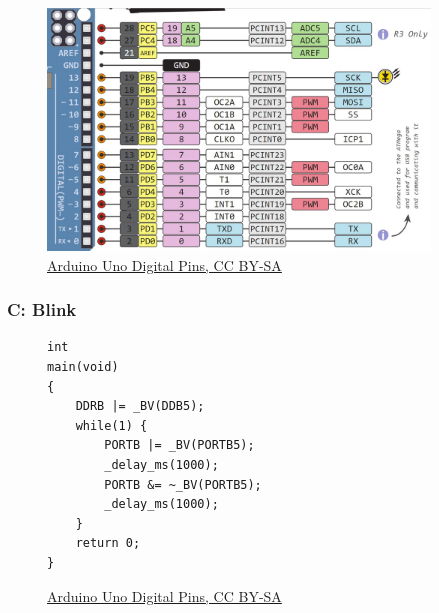 \documentclass{beamer} \usetheme{Madrid}
\begin{document}
\begin{frame}
    \vfill
    \begin{center}
    \begin{figure}
        \includegraphics[width=4in]{arduinopins.png}
        \caption{\href{https://www.circuito.io/blog/arduino-uno-pinout/}{Arduino Uno Digital Pins, CC BY-SA}}
    \end{figure}
    \end{center}
    \vfill
\end{frame}

\begin{frame}[fragile]
    \frametitle{C: Blink}
    \begin{figure}
        \begin{verbatim}
int
main(void)
{
    DDRB |= _BV(DDB5);
    while(1) {
        PORTB |= _BV(PORTB5);
        _delay_ms(1000);
        PORTB &= ~_BV(PORTB5);
        _delay_ms(1000);
    }
    return 0;
}
        \end{verbatim}
        \caption{\href{https://commons.wikimedia.org/wiki/File:Pinout_of_ARDUINO_Board_and_ATMega328PU.svg}{Arduino Uno Digital Pins, CC BY-SA}}
    \end{figure}
\end{frame}
\end{document}
